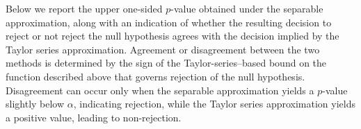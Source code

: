 \documentclass[
  12pt,
  leqno]{article}
\newenvironment{Shaded}{\begin{snugshade}}{\end{snugshade}}
\newcommand{\AttributeTok}[1]{\textcolor[rgb]{0.13,0.29,0.53}{#1}}
\newcommand{\CommentTok}[1]{\textcolor[rgb]{0.56,0.35,0.01}{\textit{#1}}}
\newcommand{\ConstantTok}[1]{\textcolor[rgb]{0.56,0.35,0.01}{#1}}
\newcommand{\ControlFlowTok}[1]{\textcolor[rgb]{0.13,0.29,0.53}{\textbf{#1}}}
\newcommand{\DecValTok}[1]{\textcolor[rgb]{0.00,0.00,0.81}{#1}}
\newcommand{\FloatTok}[1]{\textcolor[rgb]{0.00,0.00,0.81}{#1}}
\newcommand{\FunctionTok}[1]{\textcolor[rgb]{0.13,0.29,0.53}{\textbf{#1}}}
\newcommand{\NormalTok}[1]{#1}
\newcommand{\OtherTok}[1]{\textcolor[rgb]{0.56,0.35,0.01}{#1}}
\newcommand{\SpecialCharTok}[1]{\textcolor[rgb]{0.81,0.36,0.00}{\textbf{#1}}}
\newcommand{\StringTok}[1]{\textcolor[rgb]{0.31,0.60,0.02}{#1}}
\begin{document}
Below we report the upper one-sided \(p\)-value obtained under the
separable approximation, along with an indication of whether the
resulting decision to reject or not reject the null hypothesis agrees
with the decision implied by the Taylor series approximation. Agreement
or disagreement between the two methods is determined by the sign of the
Taylor-series--based bound on the function described above that governs
rejection of the null hypothesis. Disagreement can occur only when the
separable approximation yields a \(p\)-value slightly below \(\alpha\),
indicating rejection, while the Taylor series approximation yields a
positive value, leading to non-rejection.

\singlespacing

\begin{Shaded}
\end{Shaded}
\end{document}
